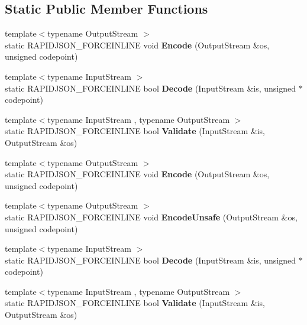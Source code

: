 \subsection*{Static Public Member Functions}
\begin{DoxyCompactItemize}
\item 
\mbox{\label{structAutoUTF_a414946115261f886e74dd42cb4b98781}} 
{\footnotesize template$<$typename Output\+Stream $>$ }\\static R\+A\+P\+I\+D\+J\+S\+O\+N\+\_\+\+F\+O\+R\+C\+E\+I\+N\+L\+I\+NE void {\bfseries Encode} (Output\+Stream \&os, unsigned codepoint)
\item 
\mbox{\label{structAutoUTF_aa5e3c1dc23dbb75f6442ff69500a35b0}} 
{\footnotesize template$<$typename Input\+Stream $>$ }\\static R\+A\+P\+I\+D\+J\+S\+O\+N\+\_\+\+F\+O\+R\+C\+E\+I\+N\+L\+I\+NE bool {\bfseries Decode} (Input\+Stream \&is, unsigned $\ast$codepoint)
\item 
\mbox{\label{structAutoUTF_a36dd6f226d6a07c12161e21c0aff20b1}} 
{\footnotesize template$<$typename Input\+Stream , typename Output\+Stream $>$ }\\static R\+A\+P\+I\+D\+J\+S\+O\+N\+\_\+\+F\+O\+R\+C\+E\+I\+N\+L\+I\+NE bool {\bfseries Validate} (Input\+Stream \&is, Output\+Stream \&os)
\item 
\mbox{\label{structAutoUTF_a414946115261f886e74dd42cb4b98781}} 
{\footnotesize template$<$typename Output\+Stream $>$ }\\static R\+A\+P\+I\+D\+J\+S\+O\+N\+\_\+\+F\+O\+R\+C\+E\+I\+N\+L\+I\+NE void {\bfseries Encode} (Output\+Stream \&os, unsigned codepoint)
\item 
\mbox{\label{structAutoUTF_a05f5dcd1f153b61b763e44ed452de251}} 
{\footnotesize template$<$typename Output\+Stream $>$ }\\static R\+A\+P\+I\+D\+J\+S\+O\+N\+\_\+\+F\+O\+R\+C\+E\+I\+N\+L\+I\+NE void {\bfseries Encode\+Unsafe} (Output\+Stream \&os, unsigned codepoint)
\item 
\mbox{\label{structAutoUTF_aa5e3c1dc23dbb75f6442ff69500a35b0}} 
{\footnotesize template$<$typename Input\+Stream $>$ }\\static R\+A\+P\+I\+D\+J\+S\+O\+N\+\_\+\+F\+O\+R\+C\+E\+I\+N\+L\+I\+NE bool {\bfseries Decode} (Input\+Stream \&is, unsigned $\ast$codepoint)
\item 
\mbox{\label{structAutoUTF_a36dd6f226d6a07c12161e21c0aff20b1}} 
{\footnotesize template$<$typename Input\+Stream , typename Output\+Stream $>$ }\\static R\+A\+P\+I\+D\+J\+S\+O\+N\+\_\+\+F\+O\+R\+C\+E\+I\+N\+L\+I\+NE bool {\bfseries Validate} (Input\+Stream \&is, Output\+Stream \&os)
\end{DoxyCompactItemize}


